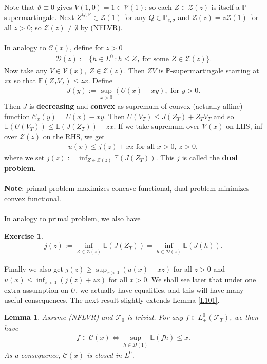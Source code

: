 \documentclass[12pt,a4paper, twoside]{article}
\newtheorem{lem}{Lemma}[section]
\newtheorem{exe}{Exercise}[section]
\theoremstyle{definition}
\newcommand{\EE}{\mathbb{E}} %
\newcommand{\PP}{\mathbb{P}} %
\begin{document}
Note that $\vartheta \equiv 0$ gives $V(1,0)=1 \in \mathcal{V}(1)$; so each $Z \in \mathcal{Z}(z)$ is itself a $\PP$-supermartingale. Next $Z^{Q; \PP} \in \mathcal{Z}(1)$ for any $Q \in \PP_{e, \sigma}$ and $\mathcal{Z}(z)=z \mathcal{Z}(1)$ for all $z >0$; so $\mathcal{Z}(z) \neq \emptyset$ by (NFLVR). 
\\\\
In analogy to $\mathcal{C}(x)$, define for $z>0$ 
\begin{align*}
\mathcal{D}(z):= \{ h \in L_+^0: h \leq Z_T \text{ for some } Z \in \mathcal{Z}(z) \}. 
\end{align*}
Now take any $V \in \mathcal{V}(x), \ Z \in \mathcal{Z}(z)$. Then $ZV$ is $\PP$-supermartingale starting at $zx$ so that $\EE(Z_TV_T) \leq zx$. Define 
\begin{align*}
J(y):= \sup_{x >0} (U(x)-xy), \text{ for } y>0. 
\end{align*}
Then $J$ is \textbf{decreasing} and \textbf{convex} as supremum of convex (actually affine) function $\mathcal{C}_x(y)=U(x)-xy$. Then $U(V_T) \leq J(Z_T) + Z_TV_T$ and so $\EE(U(V_T)) \leq \EE(J(Z_T)) + zx$. If we take supremum over $\mathcal{V}(x)$ on LHS, inf over $\mathcal{Z}(z)$ on the RHS, we get \begin{align*} u(x) \leq j(z) + xz \text{ for all } x>0, \ z>0, 
\end{align*} where we set $j(z):= \inf_{Z \in \mathcal{Z}(z)} \EE(J(Z_T)).$ This $j$ is called the \textbf{dual problem}.
\\\\
\textbf{Note}: primal problem maximizes concave functional, dual problem minimizes convex functional.
\\\\
In analogy to primal problem, we also have
\begin{exe} 
\begin{align*}
j(z):= \inf_{Z \in \mathcal{Z}(z)} \EE(J(Z_T)) = \inf_{h \in \mathcal{D}(z)} \EE(J(h)).
\end{align*}
\end{exe}
\noindent Finally we also get $j(z) \geq \sup_{x >0} (u(x)-xz)$ for all $z>0$ and $u(x) \leq \inf_{z >0} (j(z)+zx)$ for all $x>0$. We shall see later that under one extra assumption on $U$, we actually have equalities, and this will have many useful consequences.
\newpage
The next result slightly extends Lemma \ref{L101}.
\begin{lem} \label{L102} Assume (NFLVR) and $\mathcal{F}_0$ is trivial. For any $f \in L_+^0( \mathcal{F}_T)$, we then have 
\begin{align*}
f \in \mathcal{C}(x) \iff \sup_{h \in \mathcal{D}(1)} \EE(fh) \leq x.
\end{align*}
As a consequence, $\mathcal{C}(x)$ is closed in $L^0$. 
\end{lem}
\end{document}
